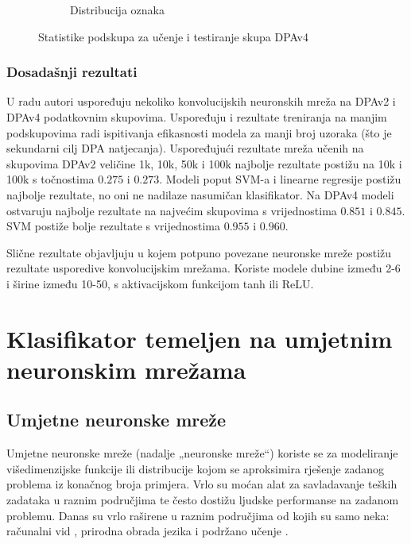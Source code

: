 \documentclass[times, utf8, numeric, diplomski]{fer}
\begin{document}
\begin{figure}[H]
\begin{subfigure}{.5\textwidth}
\centering
\caption{Distribucija oznaka}
\label{fig:dpa4_test_outputs}
\end{subfigure}
\caption{Statistike podskupa za učenje i testiranje skupa DPAv4}
\end{figure}

\subsection{Dosadašnji rezultati}
U radu \citet{samiotis_dr} autori uspoređuju nekoliko konvolucijskih neuronskih mreža na DPAv2 i DPAv4 podatkovnim skupovima. Uspoređuju i rezultate treniranja na manjim podskupovima radi ispitivanja efikasnosti modela za manji broj uzoraka (što je sekundarni cilj DPA natjecanja). Uspoređujući rezultate mreža učenih na skupovima DPAv2 veličine 1k, 10k, 50k i 100k najbolje rezultate postižu na 10k i 100k s točnostima $0.275$ i $0.273$. Modeli poput SVM-a i linearne regresije postižu najbolje rezultate, no oni ne nadilaze nasumičan klasifikator. Na DPAv4 modeli ostvaruju najbolje rezultate na najvećim skupovima s vrijednostima $0.851$ i $0.845$. SVM postiže bolje rezultate s vrijednostima $0.955$ i $0.960$. 

Slične rezultate objavljuju \citet{picek_cnn_dpa} u kojem potpuno povezane neuronske mreže postižu rezultate usporedive konvolucijskim mrežama. Koriste modele dubine između 2-6 i širine između 10-50, s aktivacijskom funkcijom tanh ili ReLU.

\chapter{Klasifikator temeljen na umjetnim neuronskim mrežama}

\section{Umjetne neuronske mreže}
Umjetne neuronske mreže (nadalje „neuronske mreže“) koriste se za modeliranje višedimenzijske funkcije ili distribucije kojom se aproksimira rješenje zadanog problema iz konačnog broja primjera. Vrlo su moćan alat za savladavanje teških zadataka u raznim područjima te često dostižu ljudske performanse na zadanom problemu. Danas su vrlo raširene u raznim područjima od kojih su samo neka: računalni vid \citep{alexnet,yolo}, prirodna obrada jezika \citep{word2vec,char_cnn} i podržano učenje \citep{atari,active_learn}.
\end{document}
